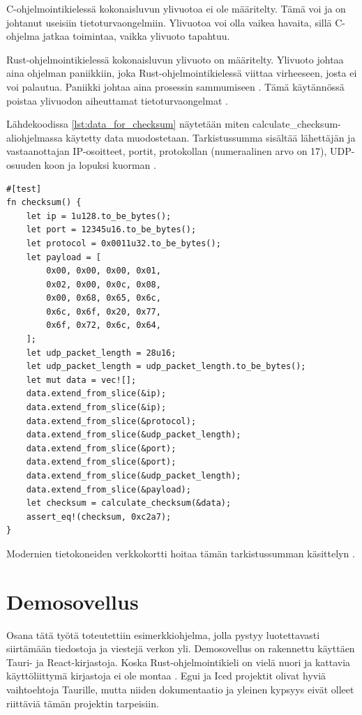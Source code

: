 \documentclass[a4paper,12pt]{article}
\begin{document}
    C-ohjelmointikielessä kokonaisluvun ylivuotoa ei ole määritelty. Tämä voi ja on johtanut useisiin tietoturvaongelmiin. Ylivuotoa voi olla vaikea havaita, sillä C-ohjelma jatkaa toimintaa, vaikka ylivuoto tapahtuu.\par
    Rust-ohjelmointikielessä kokonaisluvun ylivuoto on määritelty. Ylivuoto johtaa aina ohjelman paniikkiin, joka Rust-ohjelmointikielessä viittaa virheeseen, josta ei voi palautua. Paniikki johtaa aina prosessin sammumiseen \cite[luku 9.3]{rust-book}. Tämä käytännössä poistaa ylivuodon aiheuttamat tietoturvaongelmat \cite[luku 3.2]{rust-book}.

    Lähdekoodissa \ref{lst:data_for_checksum} näytetään miten calculate\_checksum-aliohjelmassa käytetty data muodostetaan. Tarkistussumma sisältää lähettäjän ja vastaanottajan IP-osoitteet, portit, protokollan (numeraalinen arvo on 17), UDP-osuuden koon ja lopuksi kuorman \cite{RFC-768, protocol-numbers}. \par

\newpage

        \begin{lstlisting}[caption={Tietojen kasaaminen tarkistussummaa varten.}, label={lst:data_for_checksum}]
#[test]
fn checksum() {
    let ip = 1u128.to_be_bytes();
    let port = 12345u16.to_be_bytes();
    let protocol = 0x0011u32.to_be_bytes();
    let payload = [
        0x00, 0x00, 0x00, 0x01,
        0x02, 0x00, 0x0c, 0x08,
        0x00, 0x68, 0x65, 0x6c,
        0x6c, 0x6f, 0x20, 0x77,
        0x6f, 0x72, 0x6c, 0x64,
    ];
    let udp_packet_length = 28u16;
    let udp_packet_length = udp_packet_length.to_be_bytes();
    let mut data = vec![];
    data.extend_from_slice(&ip);
    data.extend_from_slice(&ip);
    data.extend_from_slice(&protocol);
    data.extend_from_slice(&udp_packet_length);
    data.extend_from_slice(&port);
    data.extend_from_slice(&port);
    data.extend_from_slice(&udp_packet_length);
    data.extend_from_slice(&payload);
    let checksum = calculate_checksum(&data);
    assert_eq!(checksum, 0xc2a7);
}\end{lstlisting}

    Modernien tietokoneiden verkkokortti hoitaa tämän tarkistussumman käsittelyn \cite{VivianoTCP/IPOverview}.


    \section{Demosovellus}\label{sec:demo}

    Osana tätä työtä toteutettiin esimerkkiohjelma, jolla pystyy luotettavasti siirtämään tiedostoja ja viestejä verkon yli. Demosovellus on rakennettu käyttäen Tauri- ja React-kirjastoja. Koska Rust-ohjelmointikieli on vielä nuori ja kattavia käyttöliittymä kirjastoja ei ole montaa \cite{AreYet}. 
    Egui ja Iced projektit olivat hyviä vaihtoehtoja Taurille, mutta niiden dokumentaatio ja yleinen kypsyys eivät olleet riittäviä tämän projektin tarpeisiin. \par
\end{document}

